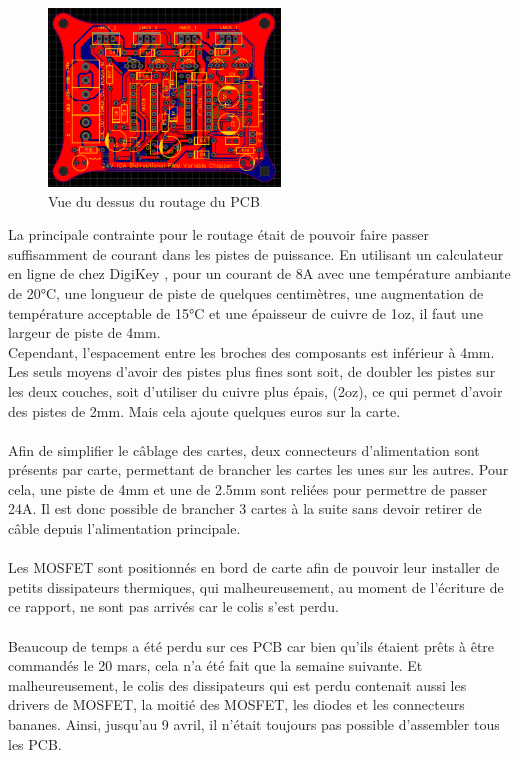 \documentclass{article}
\begin{document}
     \begin{figure}[H]
    \centering
        \includegraphics[width = 0.55\textwidth]{Images/PCB_top.png}
        \caption{Vue du dessus du routage du PCB}
        \label{fig:PCB_Top}
    \end{figure}
\noindent
La principale contrainte pour le routage était de pouvoir faire passer suffisamment de courant dans les pistes de puissance. En utilisant un calculateur en ligne de chez DigiKey \cite{ref14}, pour un courant de 8A avec une température ambiante de 20°C, une longueur de piste de quelques centimètres, une augmentation de température acceptable de 15°C et une épaisseur de cuivre de 1oz, il faut une largeur de piste de 4mm.\\Cependant, l'espacement entre les broches des composants est inférieur à 4mm. Les seuls moyens d'avoir des pistes plus fines sont soit, de doubler les pistes sur les deux couches, soit d'utiliser du cuivre plus épais, (2oz), ce qui permet d'avoir des pistes de 2mm. Mais cela ajoute quelques euros sur la carte.
\\\\
Afin de simplifier le câblage des cartes, deux connecteurs d'alimentation sont présents par carte, permettant de brancher les cartes les unes sur les autres. Pour cela, une piste de 4mm et une de 2.5mm sont reliées pour permettre de passer 24A. Il est donc possible de brancher 3 cartes à la suite sans devoir retirer de câble depuis l'alimentation principale.
\\\\
Les MOSFET sont positionnés en bord de carte afin de pouvoir leur installer de petits dissipateurs thermiques, qui malheureusement, au moment de l'écriture de ce rapport, ne sont pas arrivés car le colis s'est perdu.
\\\\
Beaucoup de temps a été perdu sur ces PCB car bien qu'ils étaient prêts à être commandés le 20 mars, cela n'a été fait que la semaine suivante. Et malheureusement, le colis des dissipateurs qui est perdu contenait aussi les drivers de MOSFET, la moitié des MOSFET, les diodes et les connecteurs bananes. Ainsi, jusqu'au 9 avril, il n'était toujours pas possible d'assembler tous les PCB.
\end{document}
